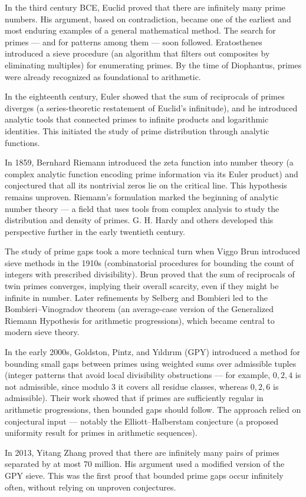 \begin{historical}
In the third century BCE, Euclid proved that there are infinitely many prime numbers. His argument, based on contradiction, became one of the earliest and most enduring examples of a general mathematical method. The search for primes — and for patterns among them — soon followed. Eratosthenes introduced a sieve procedure (an algorithm that filters out composites by eliminating multiples) for enumerating primes. By the time of Diophantus, primes were already recognized as foundational to arithmetic.

In the eighteenth century, Euler showed that the sum of reciprocals of primes diverges (a series-theoretic restatement of Euclid’s infinitude), and he introduced analytic tools that connected primes to infinite products and logarithmic identities. This initiated the study of prime distribution through analytic functions.

In 1859, Bernhard Riemann introduced the zeta function into number theory (a complex analytic function encoding prime information via its Euler product) and conjectured that all its nontrivial zeros lie on the critical line. This hypothesis remains unproven. Riemann’s formulation marked the beginning of analytic number theory — a field that uses tools from complex analysis to study the distribution and density of primes. G. H. Hardy and others developed this perspective further in the early twentieth century.

The study of prime gaps took a more technical turn when Viggo Brun introduced sieve methods in the 1910s (combinatorial procedures for bounding the count of integers with prescribed divisibility). Brun proved that the sum of reciprocals of twin primes converges, implying their overall scarcity, even if they might be infinite in number. Later refinements by Selberg and Bombieri led to the Bombieri–Vinogradov theorem (an average-case version of the Generalized Riemann Hypothesis for arithmetic progressions), which became central to modern sieve theory.

In the early 2000s, Goldston, Pintz, and Yıldırım (GPY) introduced a method for bounding small gaps between primes using weighted sums over admissible tuples (integer patterns that avoid local divisibility obstructions — for example, ${0, 2, 4}$ is not admissible, since modulo 3 it covers all residue classes, whereas ${0, 2, 6}$ is admissible). Their work showed that if primes are sufficiently regular in arithmetic progressions, then bounded gaps should follow. The approach relied on conjectural input — notably the Elliott–Halberstam conjecture (a proposed uniformity result for primes in arithmetic sequences).

In 2013, Yitang Zhang proved that there are infinitely many pairs of primes separated by at most 70 million. His argument used a modified version of the GPY sieve. This was the first proof that bounded prime gaps occur infinitely often, without relying on unproven conjectures.
\end{historical}
